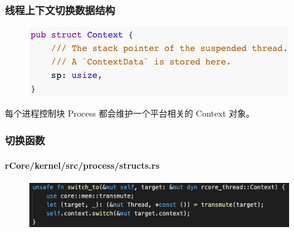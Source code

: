 % 
% 
% 

\begin{frame}[fragile]
    \frametitle{线程上下文切换数据结构}
    \begin{figure}
    \includegraphics[width=0.7\linewidth]{figs/struct-Context.png}
    \end{figure}

每个进程控制块 Process 都会维护一个平台相关的 Context 对象。

\end{frame}

% 
% 
% 
\begin{frame}[fragile]
    \frametitle{切换函数}
    \framesubtitle{rCore/kernel/src/process/structs.rs}
    \begin{figure}
    \includegraphics[width=0.9\linewidth]{figs/switch-to.png}
    \end{figure}
\end{frame}

